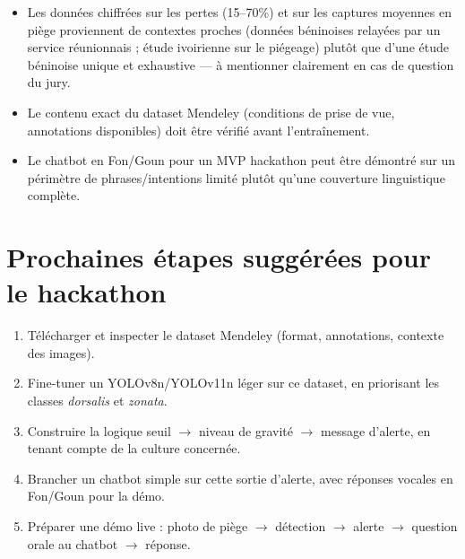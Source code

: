 \documentclass[11pt,a4paper]{article}
\begin{document}
\begin{itemize}
    \item Les données chiffrées sur les pertes (15--70\%) et sur les captures moyennes en piège proviennent de contextes proches (données béninoises relayées par un service réunionnais ; étude ivoirienne sur le piégeage) plutôt que d'une étude béninoise unique et exhaustive — à mentionner clairement en cas de question du jury.
    \item Le contenu exact du dataset Mendeley (conditions de prise de vue, annotations disponibles) doit être vérifié avant l'entraînement.
    \item Le chatbot en Fon/Goun pour un MVP hackathon peut être démontré sur un périmètre de phrases/intentions limité plutôt qu'une couverture linguistique complète.
\end{itemize}

\section{Prochaines étapes suggérées pour le hackathon}

\begin{enumerate}
    \item Télécharger et inspecter le dataset Mendeley (format, annotations, contexte des images).
    \item Fine-tuner un YOLOv8n/YOLOv11n léger sur ce dataset, en priorisant les classes \textit{dorsalis} et \textit{zonata}.
    \item Construire la logique seuil $\rightarrow$ niveau de gravité $\rightarrow$ message d'alerte, en tenant compte de la culture concernée.
    \item Brancher un chatbot simple sur cette sortie d'alerte, avec réponses vocales en Fon/Goun pour la démo.
    \item Préparer une démo live : photo de piège $\rightarrow$ détection $\rightarrow$ alerte $\rightarrow$ question orale au chatbot $\rightarrow$ réponse.
\end{enumerate}
\end{document}
